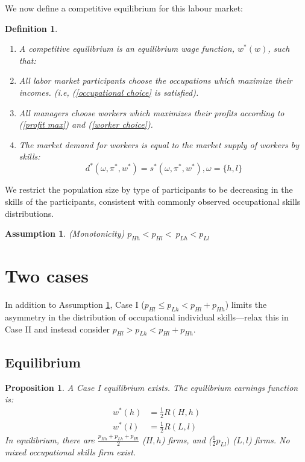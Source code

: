 \documentclass[12 pt]{article}
\newtheorem{assumption}{Assumption} %
\newtheorem{proposition}{Proposition} %
\newtheorem{definition}{Definition}
\begin{document}
We now define a competitive equilibrium for this labour market:
\begin{definition}
	\begin{enumerate}
		Let $P(M,w)$ be the population supply of skills.
		
		\item A competitive equilibrium is an equilibrium wage function, $w^{\ast}%
		(w)$, such that:
		
		\item All labor market participants choose the occupations which maximize
		their incomes. (i.e, (\ref{occupational choice} is satisfied).
		
		\item All managers choose workers which maximizes their profits according to
		(\ref{profit max}) and (\ref{worker choice}).
		
		\item The market demand for workers is equal to the market supply of workers
		by skills:%
		\begin{equation}
			d^{\ast}(\omega,\pi^{\ast},w^{\ast})=s^{\ast}(\omega,\pi^{\ast},w^{\ast
			}),\omega=\{h,l\} \label{market equilibrium}%
		\end{equation}
		
	\end{enumerate}
\end{definition}

We restrict the population size by type of participants to be decreasing in the skills of the
participants, consistent with commonly observed occupational skills
distributions. 

\begin{assumption}
	(Monotonicity) $p_{Hh}<p_{Hl}<\,p_{Lh}<p_{Ll}$
	\label{monotonicity}
\end{assumption}

\section{Two cases}

	
In addition to Assumption \ref{monotonicity}, Case I ($p_{Hl}\leq p_{Lh}<p_{Hl}+p_{Hh}$) limits the asymmetry in the distribution of occupational individual skills---relax this in Case II and instead consider $p_{Hl} > p_{Lh}<p_{Hl}+p_{Hh}$.

\subsection{Equilibrium}
\begin{proposition}
	\label{p1}A Case I equilibrium exists. The equilibrium earnings function is:%
	\begin{align}
		w^{\ast}(h) &  =\frac{1}{2}R(H,h)\label{Case 1 wage function}\\
		w^{\ast}(l) &  =\frac{1}{2}R(L,l)\nonumber
	\end{align}
	In equilibrium, there are $\frac{p_{Hh}+p_{Lh}+p_{Hl}}{2}$ ($H,h$) firms, and
	($\frac{1}{2}p_{Ll})$ ($L,l$) firms. No mixed occupational skills firm exist.
\end{proposition}
\end{document}
